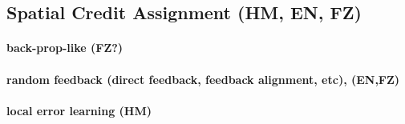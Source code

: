 \documentclass[journal,onecolumn,11pt]{IEEEtran}
\begin{document}
\subsection{Spatial Credit Assignment (HM, EN, FZ)}
\paragraph{back-prop-like (FZ?)}
\paragraph{random feedback (direct feedback, feedback alignment, etc), (EN,FZ)}
\paragraph{local error learning (HM)}
\label{sec:spatial_credit_assignment}
\end{document}
